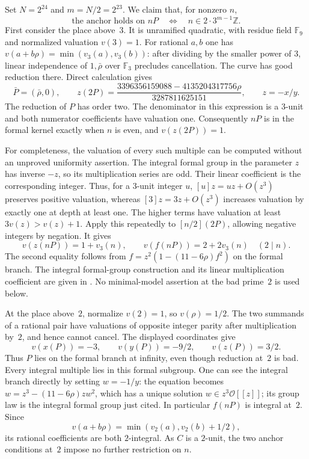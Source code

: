 Set $N=2^{24}$ and $m=N/2=2^{23}$. We claim that, for nonzero $n$,
\[
 \text{the anchor holds on }nP
 \quad\Longleftrightarrow\quad
 n\in 2\cdot3^{m-1}\mathbb Z.
\]
First consider the place above~$3$. It is unramified quadratic, with
residue field $\mathbb F_9$ and normalized valuation $v(3)=1$.
For rational $a,b$ one has
$v(a+b\rho)=\min(v_3(a),v_3(b))$: after dividing by the smaller
power of $3$, linear independence of $1,\bar\rho$ over $\mathbb F_3$
precludes cancellation.
The curve has good reduction there. Direct calculation gives
\[
 \bar P=(\bar\rho,0),\qquad
 z(2P)=
 \frac{3396356159088-4135204317756\rho}{3287811625151},
 \qquad z=-x/y.
\]
The reduction of $P$ has order two. The denominator in this expression
is a $3$-unit and both numerator coefficients have valuation one.
Consequently $nP$ is in the formal kernel exactly when $n$ is even,
and $v(z(2P))=1$.

For completeness, the valuation of every such multiple can be computed
without an unproved uniformity assertion. The integral formal group
in the parameter $z$ has inverse $-z$, so its multiplication series
are odd. Their linear coefficient is the corresponding integer.
Thus, for a $3$-unit integer $u$, $[u]z=uz+O(z^3)$ preserves positive
valuation, whereas $[3]z=3z+O(z^3)$ increases valuation by exactly one
at depth at least one. The higher terms have valuation at least
$3v(z)>v(z)+1$. Apply this repeatedly to $[n/2](2P)$, allowing
negative integers by negation. It gives
\[
 v(z(nP))=1+v_3(n),\qquad
 v(f(nP))=2+2v_3(n)\quad(2\mid n).
\]
The second equality follows from
$f=z^2(1-(11-6\rho)f^2)$ on the formal branch.
The integral formal-group construction and its linear multiplication
coefficient are given in \cite[IV\S1, Example~IV.2.2.3 and
Proposition~IV.2.3(a)]{silverman}. No minimal-model assertion at
the bad prime~$2$ is used below.

At the place above~$2$, normalize $v(2)=1$, so $v(\rho)=1/2$.
The two summands of a rational pair have valuations of opposite
integer parity after multiplication by~$2$, and hence cannot cancel.
The displayed coordinates give
\[
 v(x(P))=-3,\qquad v(y(P))=-9/2,\qquad v(z(P))=3/2.
\]
Thus $P$ lies on the formal branch at infinity, even though reduction
at~$2$ is bad. Every integral multiple lies in this formal subgroup.
One can see the integral branch directly by setting $w=-1/y$:
the equation becomes $w=z^3-(11-6\rho)zw^2$, which has a unique
solution $w\in z^3\mathcal O[[z]]$; its group law is the integral
formal group just cited. In particular $f(nP)$ is integral at~$2$.
Since
\[
 v(a+b\rho)=\min(v_2(a),v_2(b)+1/2),
\]
its rational coefficients are both $2$-integral. As $C$ is a $2$-unit,
the two anchor conditions at~$2$ impose no further restriction on $n$.

